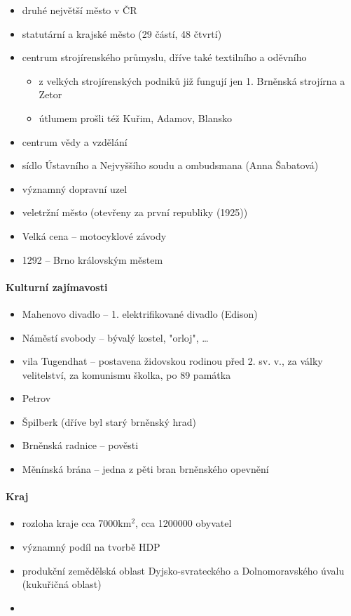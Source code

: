 \begin{itemize}
\item druhé největší město v ČR
\item statutární a krajské město (29 částí, 48 čtvrtí)
\item centrum strojírenského průmyslu, dříve také textilního a oděvního
	\begin{itemize}
	\item z velkých strojírenských podniků již fungují jen 1. Brněnská strojírna a Zetor
	\item útlumem prošli též Kuřim, Adamov, Blansko
	\end{itemize}
\item centrum vědy a vzdělání
\item sídlo Ústavního a Nejvyššího soudu a ombudsmana (Anna Šabatová)
\item významný dopravní uzel
\item veletržní město (otevřeny za první republiky (1925))
\item Velká cena -- motocyklové závody
\item 1292 -- Brno královským městem
\end{itemize}

\paragraph{Kulturní zajímavosti}
\begin{itemize}
\item Mahenovo divadlo -- 1. elektrifikované divadlo (Edison)
\item Náměstí svobody -- bývalý kostel, "orloj", \ldots
\item vila Tugendhat -- postavena židovskou rodinou před 2. sv. v., za války velitelství, za komunismu školka, po 89 památka
\item Petrov
\item Špilberk (dříve byl starý brněnský hrad)
\item Brněnská radnice -- pověsti
\item Měnínská brána -- jedna z pěti bran brněnského opevnění
\end{itemize}

\paragraph{Kraj}
\begin{itemize}
\item rozloha kraje cca 7000km$^2$, cca 1200000 obyvatel
\item významný podíl na tvorbě HDP
\item produkční zemědělská oblast Dyjsko-svrateckého a Dolnomoravského úvalu (kukuřičná oblast)
\item 
\end{itemize}

